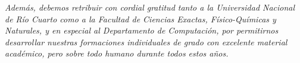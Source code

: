 {\sl Además, debemos retribuir con cordial gratitud tanto a la Universidad Nacional de Río Cuarto como a la Facultad de Ciencias Exactas, Físico-Químicas y Naturales, y en especial al Departamento de Computación, por permitirnos desarrollar nuestras formaciones individuales de grado con excelente material académico, pero sobre todo humano durante todos estos años.
}





